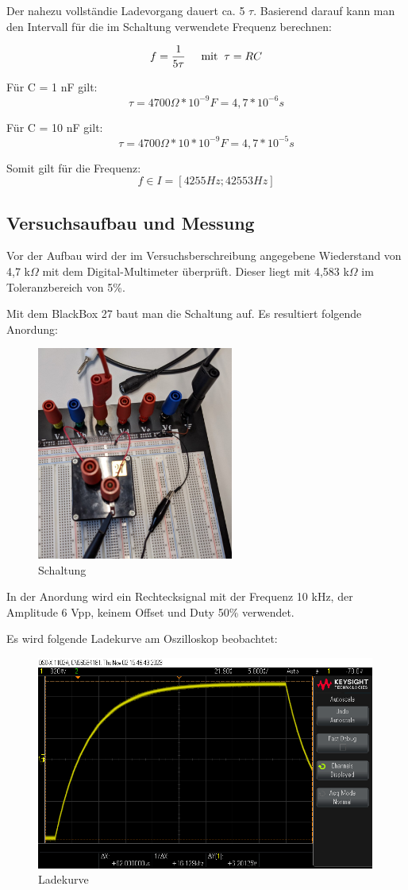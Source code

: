 Der nahezu vollständie Ladevorgang dauert ca. 5 $\tau$. Basierend darauf kann
man den Intervall für die im Schaltung verwendete Frequenz berechnen:

\[
    f = \frac{1}{5\tau} \hspace{0.5cm} \text{mit} \hspace{0.2cm} \tau = RC
\]

Für C = 1 nF gilt:
\[
    \tau =4700 \Omega*10^{-9}F = 4,7*10^{-6}s
\]

Für C = 10 nF gilt:
\[
    \tau =4700 \Omega * 10*10^{-9}F = 4,7*10^{-5}s
\]

Somit gilt für die Frequenz: \[ f \in I=[4255Hz; 42553Hz] \]

\subsection{Versuchsaufbau und Messung}
Vor der Aufbau wird der im Versuchsberschreibung angegebene Wiederstand 
von 4,7 k$\Omega$ mit dem Digital-Multimeter überprüft. Dieser liegt 
mit 4,583 k$\Omega$ im Toleranzbereich von 5\%. 

Mit dem BlackBox 27 baut man die Schaltung auf. Es resultiert folgende Anordung:
\begin{figure}[H]
	\centering
	\includegraphics[height=7cm]{images/Versuch1/Versuch1_schaltung_gebaut.jpg} 
	\caption{Schaltung}
	\label{fig: Schaltung}
\end{figure}

In der Anordung wird ein Rechtecksignal mit der Frequenz 10 kHz, 
der Amplitude 6 Vpp, keinem Offset und Duty 50\% verwendet.

Es wird folgende Ladekurve am Oszilloskop beobachtet:
\begin{figure}[H]
	\centering
	\includegraphics[height=7cm]{images/Versuch1/Ladekurve_voll_6021V.png} 
	\caption{Ladekurve}
	\label{fig: Ladekurve}
\end{figure}

